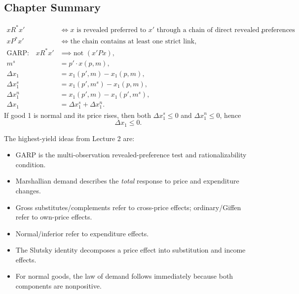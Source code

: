 \subsection{Chapter Summary}

\begin{keyformula}[title={Key Formula: Lecture 2 Summary}]
\begin{align*}
x R^* x' &\iff \text{$x$ is revealed preferred to $x'$ through a chain of direct revealed preferences}, \\
x P^* x' &\iff \text{the chain contains at least one strict link}, \\
\text{GARP:}\quad x R^* x' &\implies \text{not }(x' P x), \\
m^s &= p' \cdot x(p,m), \\
\Delta x_1 &= x_1(p',m)-x_1(p,m), \\
\Delta x_1^s &= x_1(p',m^s)-x_1(p,m), \\
\Delta x_1^n &= x_1(p',m)-x_1(p',m^s), \\
\Delta x_1 &= \Delta x_1^s + \Delta x_1^n.
\end{align*}
If good 1 is normal and its price rises, then both $\Delta x_1^s \le 0$ and $\Delta x_1^n \le 0$, hence
\[
\Delta x_1 \le 0.
\]
\end{keyformula}

\begin{examtip}
The highest-yield ideas from Lecture 2 are:
\begin{itemize}
    \item GARP is the multi-observation revealed-preference test and rationalizability condition.
    \item Marshallian demand describes the \emph{total} response to price and expenditure changes.
    \item Gross substitutes/complements refer to cross-price effects; ordinary/Giffen refer to own-price effects.
    \item Normal/inferior refer to expenditure effects.
    \item The Slutsky identity decomposes a price effect into substitution and income effects.
    \item For normal goods, the law of demand follows immediately because both components are nonpositive.
\end{itemize}
\end{examtip}